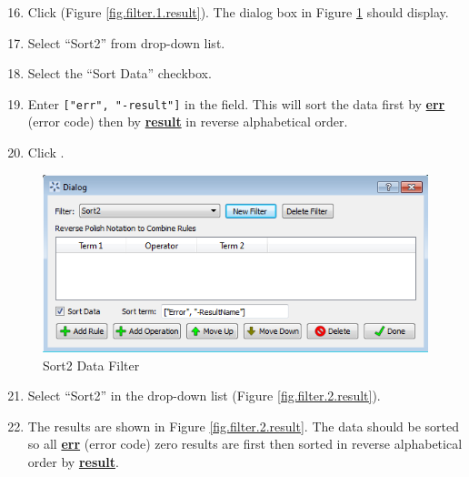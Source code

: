 \begin{enumerate}
	\setcounter{enumi}{15}
	\item Click  (Figure \ref{fig.filter.1.result}). The dialog box in Figure \ref{fig.filter.2} should display.
	\item Select ``Sort2'' from  drop-down list.
	\item Select the ``Sort Data'' checkbox.
	\item Enter \verb|["err", "-result"]| in the  field.  This will sort the data first by \textbf{\underline{err}} (error code) then by \textbf{\underline{result}} in reverse alphabetical order.
	\item Click .
\end{enumerate}

\begin{figure}[H]
	\begin{center}
		\includegraphics[scale=0.55]{Chapt_flowsheet/figs/filter_2}
		\caption{Sort2 Data Filter}
		\label{fig.filter.2}
	\end{center}
\end{figure}

\begin{enumerate}
	\setcounter{enumi}{20}
	\item Select ``Sort2'' in the  drop-down list (Figure \ref{fig.filter.2.result}). 
	\item The results are shown in Figure \ref{fig.filter.2.result}. The data should be sorted so all \textbf{\underline{err}} (error code) zero results are first then sorted in reverse alphabetical order by \textbf{\underline{result}}.
\end{enumerate}

